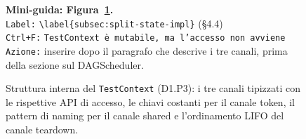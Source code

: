 \begin{figure}[ht]
{
  }%
  \caption{Struttura interna del \texttt{TestContext} (D1.P3): i tre canali tipizzati con le rispettive \gls{API} di accesso, le chiavi costanti per il canale token, il pattern di naming per il canale shared e l'ordinamento \gls{LIFO} del canale teardown.}
  \label{fig:testcontext-channels}
  \par\smallskip
  {\small \noindent\textbf{Mini-guida: Figura~\ref{fig:testcontext-channels}.}\\
    \texttt{Label:} \verb|\label{subsec:split-state-impl}| (\S4.4)\\
    \texttt{Ctrl+F:} \texttt{TestContext è mutabile, ma l'accesso non avviene}\\
    \texttt{Azione:} inserire dopo il paragrafo che descrive i tre canali, prima della sezione sul DAGScheduler. }
\end{figure}


